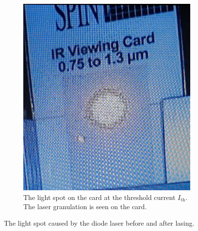 \begin{figure}[ht]
    \hfill
    \begin{subfigure}{0.49\textwidth}
        \includegraphics[width=\textwidth]{bilder/laser_after.jpg}
        \caption{The light spot on the card at the threshold current $I_\text{th}$. The laser granulation is seen on the card. \cite{anleitungHeNe}}
        \label{fig:laser_after}
    \end{subfigure}
    \caption{The light spot caused by the diode laser before and after lasing.}
\end{figure}

\FloatBarrier

